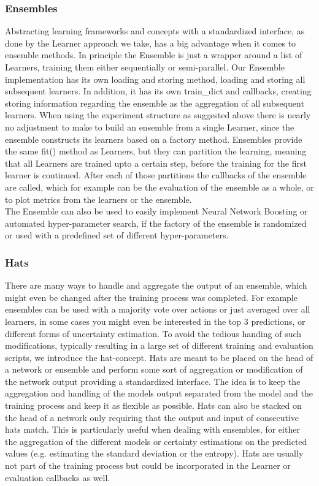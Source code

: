 \documentclass[11pt,a4paper]{article}
\begin{document}
	\subsubsection{Ensembles}
	Abstracting learning frameworks and concepts with a standardized interface, as done by the Learner approach we take, has a big advantage when it comes to ensemble methods.
	In principle the Ensemble is just a wrapper around a list of Learners, training them either sequentially or semi-parallel.
	Our Ensemble implementation has its own loading and storing method, loading and storing all subsequent learners.
	In addition, it has its own train\_dict and callbacks, creating storing information regarding the ensemble as the aggregation of all subsequent learners.
	When using the experiment structure as suggested above there is nearly no adjustment to make to build an ensemble from a single Learner, since the ensemble constructs its learners based on a factory method.
	Ensembles provide the same fit() method as Learners, but they can partition the learning, meaning that all Learners are trained upto a certain step, before the training for the first learner is continued.
	After each of those partitions the callbacks of the ensemble are called, which for example can be the evaluation of the ensemble as a whole, or to plot metrics from the learners or the ensemble.\\

	The Ensemble can also be used to easily implement Neural Network Boosting or automated hyper-parameter search, if the factory of the ensemble is randomized or used with a predefined set of different hyper-parameters.

	\subsubsection{Hats}
	There are many ways to handle and aggregate the output of an ensemble, which might even be changed after the training process was completed.
	For example ensembles can be used with a majority vote over actions or just averaged over all learners, in some cases you might even be interested in the top 3 predictions, or different forms of uncertainty estimation.
	To avoid the tedious handing of such modifications, typically resulting in a large set of different training and evaluation scripts, we introduce the hat-concept.
	Hats are meant to be placed on the head of a network or ensemble and perform some sort of aggregation or modification of the network output providing a standardized interface.
	The idea is to keep the aggregation and handling of the models output separated from the model and the training process and keep it as flexible as possible.
	Hats can also be stacked on the head of a network only requiring that the output and input of consecutive hats match.
	This is particularly useful when dealing with ensembles, for either the aggregation of the different models or certainty estimations on the predicted values (e.g. estimating the standard deviation or the entropy).
	Hats are usually not part of the training process but could be incorporated in the Learner or evaluation callbacks as well.
\end{document}
